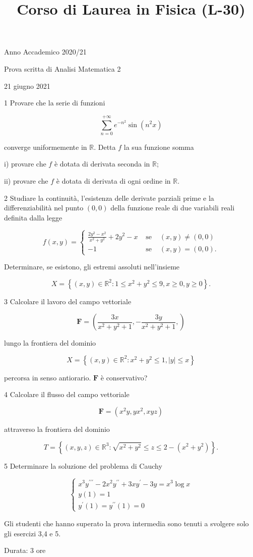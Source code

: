 \documentclass[10pt]{article}
\title{Corso di Laurea in Fisica (L-30) }
\author{}
\date{}
\begin{document}
\maketitle
Anno Accademico 2020/21

Prova scritta di Analisi Matematica 2

21 giugno 2021

1 Provare che la serie di funzioni

\[
\sum_{n=0}^{+\infty} e^{-n^{2}} \sin \left(n^{2} x\right)
\]

converge uniformemente in \(\mathbb{R}\). Detta \(f\) la sua funzione somma

i) provare che \(f\) è dotata di derivata seconda in \(\mathbb{R}\);

ii) provare che \(f\) è dotata di derivata di ogni ordine in \(\mathbb{R}\).

2 Studiare la continuità, l'esistenza delle derivate parziali prime e la differenziabilità nel punto \((0,0)\) della funzione reale di due variabili reali definita dalla legge

\[
f(x, y)=\left\{\begin{array}{lll}
\frac{2 y^{2}-x^{2}}{x^{2}+y^{2}}+2 y^{2}-x & \text { se } & (x, y) \neq(0,0) \\
-1 & \text { se } & (x, y)=(0,0) .
\end{array}\right.
\]

Determinare, se esistono, gli estremi assoluti nell'insieme

\[
X=\left\{(x, y) \in \mathbb{R}^{2}: 1 \leq x^{2}+y^{2} \leq 9, x \geq 0, y \geq 0\right\} .
\]

3 Calcolare il lavoro del campo vettoriale

\[
\mathbf{F}=\left(\frac{3 x}{x^{2}+y^{2}+1},-\frac{3 y}{x^{2}+y^{2}+1},\right)
\]

lungo la frontiera del dominio

\[
X=\left\{(x, y) \in \mathbb{R}^{2}: x^{2}+y^{2} \leq 1,|y| \leq x\right\}
\]

percorsa in senso antiorario. \(\mathbf{F}\) è conservativo?

4 Calcolare il flusso del campo vettoriale

\[
\mathbf{F}=\left(x^{2} y, y x^{2}, x y z\right)
\]

attraverso la frontiera del dominio

\[
T=\left\{(x, y, z) \in \mathbb{R}^{3}: \sqrt{x^{2}+y^{2}} \leq z \leq 2-\left(x^{2}+y^{2}\right)\right\} .
\]

5 Determinare la soluzione del problema di Cauchy

\[
\left\{\begin{array}{l}
x^{3} y^{\prime \prime \prime}-2 x^{2} y^{\prime \prime}+3 x y^{\prime}-3 y=x^{3} \log x \\
y(1)=1 \\
y^{\prime}(1)=y^{\prime \prime}(1)=0
\end{array}\right.
\]

Gli studenti che hanno superato la prova intermedia sono tenuti a svolgere solo gli esercizi 3,4 e 5.

Durata: 3 ore
\end{document}
